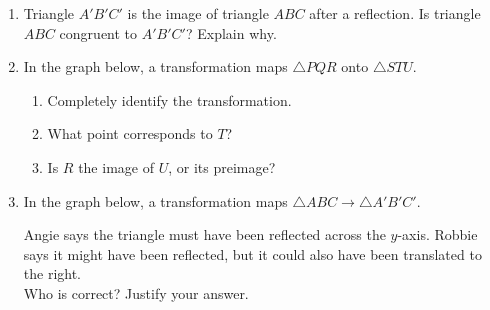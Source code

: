 \documentclass[12pt, twoside]{article}
\begin{document}
\begin{enumerate}
\newpage
\item Triangle $A'B'C'$ is the image of triangle $ABC$ after a reflection. Is triangle $ABC$ congruent to $A'B'C'$? Explain why. \vspace{3cm}

\item In the graph below, a transformation maps $\triangle PQR$ onto $\triangle STU$.
\begin{multicols}{2}
  \begin{enumerate}
    \item Completely identify the transformation.
    \item What point corresponds to $T$?
    \item Is $R$ the image of $U$, or its preimage? \vspace{1cm}
  \end{enumerate}
\end{multicols}

\item In the graph below, a transformation maps $\triangle ABC \rightarrow \triangle A'B'C'$.
\begin{multicols}{2}
Angie says the triangle must have been reflected across the $y$-axis. Robbie says it might have been reflected, but it could also have been translated to the right.\\[0.25cm] 
Who is correct? Justify your answer.
\end{multicols}


\end{enumerate}
\end{document}
